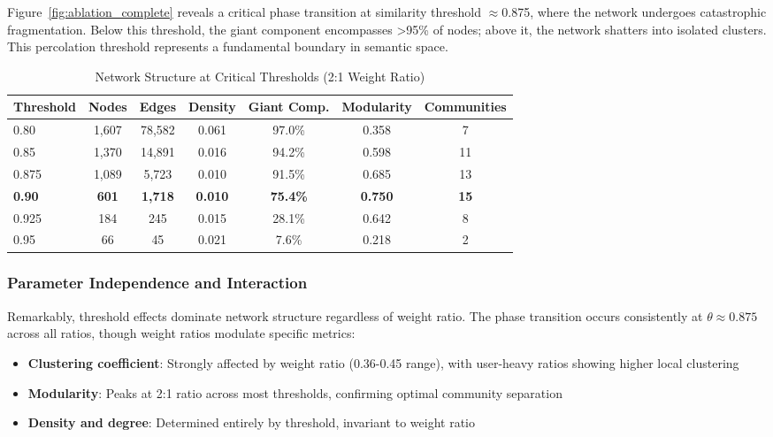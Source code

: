 Figure~\ref{fig:ablation_complete} reveals a critical phase transition at similarity threshold $\approx$0.875, where the network undergoes catastrophic fragmentation. Below this threshold, the giant component encompasses >95\% of nodes; above it, the network shatters into isolated clusters. This percolation threshold represents a fundamental boundary in semantic space.

\begin{table}[h]
\centering
\caption{Network Structure at Critical Thresholds (2:1 Weight Ratio)}
\label{tab:threshold_comparison_ablation}
\begin{tabular}{lcccccc}
\toprule
\textbf{Threshold} & \textbf{Nodes} & \textbf{Edges} & \textbf{Density} & \textbf{Giant Comp.} & \textbf{Modularity} & \textbf{Communities} \\
\midrule
0.80 & 1,607 & 78,582 & 0.061 & 97.0\% & 0.358 & 7 \\
0.85 & 1,370 & 14,891 & 0.016 & 94.2\% & 0.598 & 11 \\
0.875 & 1,089 & 5,723 & 0.010 & 91.5\% & 0.685 & 13 \\
\textbf{0.90} & \textbf{601} & \textbf{1,718} & \textbf{0.010} & \textbf{75.4\%} & \textbf{0.750} & \textbf{15} \\
0.925 & 184 & 245 & 0.015 & 28.1\% & 0.642 & 8 \\
0.95 & 66 & 45 & 0.021 & 7.6\% & 0.218 & 2 \\
\bottomrule
\end{tabular}
\end{table}

\subsubsection{Parameter Independence and Interaction}

Remarkably, threshold effects dominate network structure regardless of weight ratio. The phase transition occurs consistently at $\theta \approx 0.875$ across all ratios, though weight ratios modulate specific metrics:

\begin{itemize}
    \item \textbf{Clustering coefficient}: Strongly affected by weight ratio (0.36-0.45 range), with user-heavy ratios showing higher local clustering
    \item \textbf{Modularity}: Peaks at 2:1 ratio across most thresholds, confirming optimal community separation
    \item \textbf{Density and degree}: Determined entirely by threshold, invariant to weight ratio
\end{itemize}

